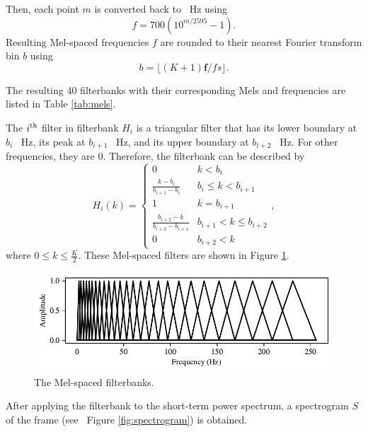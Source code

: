 			Then, each point $m$ is converted back to \SI{}{\Hz} using
			\begin{equation}
				f = 700\left(10^{m/2595}-1\right).
			\end{equation}
			Resulting Mel-spaced frequencies $f$ are rounded to their nearest Fourier transform bin $b$ using
			\begin{equation}
				b = \lfloor(K+1)\mathbf{f}/fs\rfloor.
			\end{equation}

			The resulting 40 filterbanks with their corresponding Mels and frequencies are listed in Table \ref{tab:mels}.

			The $i\textsuperscript{th}$ filter in filterbank $H_i$ is a triangular filter that has its lower boundary at $b_{i}$ \SI{}{\Hz}, its peak at $b_{i+1}$ \SI{}{\Hz}, and its upper boundary at $b_{i+2}$ \SI{}{\Hz}.
			For other frequencies, they are 0.
			Therefore, the filterbank can be described by
			\begin{equation}
				H_i(k) = \begin{cases}
					0 & k<b_i\\
					\frac{k-b_i}{b_{i+1}-b_i} & b_i\leq k < b_{i+1} \\
					1 & k = b_{i+1} \\
					\frac{b_{i+2} - k}{b_{i+2}-b_{i+1}} & b_{i+1} < k \leq b_{i+2}\\
					0 & b_{i+2} < k
				\end{cases},
			\end{equation}
			where $0 \leq k \leq \frac{K}{2}$.
			These Mel-spaced filters are shown in Figure \ref{fig:filterbank}.
			\begin{figure}[ht]
				\centering
			    \includegraphics[width=\linewidth]{gfx/fbanks}
			    \caption{The Mel-spaced filterbanks.}
			    \label{fig:filterbank}
			\end{figure}

			After applying the filterbank to the short-term power spectrum, a spectrogram $S$ of the frame (see \eg~Figure \ref{fig:spectrogram}) is obtained.

